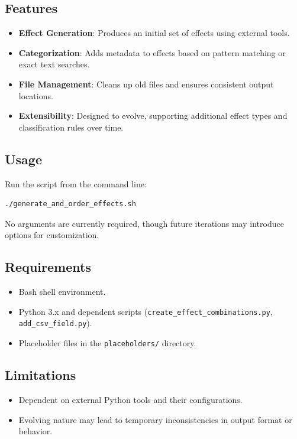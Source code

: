 \subsection{Features}
\begin{itemize}
    \item \textbf{Effect Generation}: Produces an initial set of effects using external tools.
    \item \textbf{Categorization}: Adds metadata to effects based on pattern matching or exact text searches.
    \item \textbf{File Management}: Cleans up old files and ensures consistent output locations.
    \item \textbf{Extensibility}: Designed to evolve, supporting additional effect types and classification rules over time.
\end{itemize}

\subsection{Usage}
Run the script from the command line:
\begin{lstlisting}[style=terminalstyle]
./generate_and_order_effects.sh
\end{lstlisting}
No arguments are currently required, though future iterations may introduce options for customization.

\subsection{Requirements}
\begin{itemize}
    \item Bash shell environment.
    \item Python 3.x and dependent scripts (\texttt{create\_effect\_combinations.py}, \texttt{add\_csv\_field.py}).
    \item Placeholder files in the \texttt{placeholders/} directory.
\end{itemize}

\subsection{Limitations}
\begin{itemize}
    \item Dependent on external Python tools and their configurations.
    \item Evolving nature may lead to temporary inconsistencies in output format or behavior.
\end{itemize}







